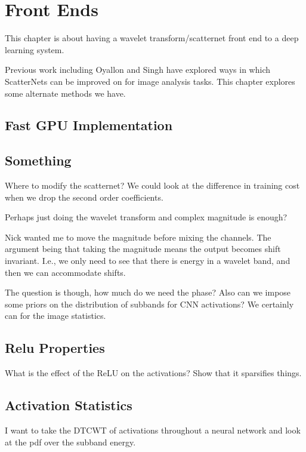 \chapter{Front Ends}

This chapter is about having a wavelet transform/scatternet front end to a deep
learning system.

Previous work including Oyallon and Singh have explored ways in which
ScatterNets can be improved on for image analysis tasks. This chapter explores
some alternate methods we have.

\section{Fast GPU Implementation}

\section{Something}
Where to modify the scatternet? We could look at the difference in training cost
when we drop the second order coefficients.

Perhaps just doing the wavelet transform and complex magnitude is enough?

Nick wanted me to move the magnitude before mixing the channels. The argument
being that taking the magnitude means the output becomes shift invariant. I.e.,
we only need to see that there is energy in a wavelet band, and then we can
accommodate shifts.

The question is though, how much do we need the phase? Also can we impose some
priors on the distribution of subbands for CNN activations? We certainly can for
the image statistics.

\section{Relu Properties}
What is the effect of the ReLU on the activations? Show that it sparsifies
things.

\section{Activation Statistics}
I want to take the DTCWT of activations throughout a neural network and look at
the pdf over the subband energy.


